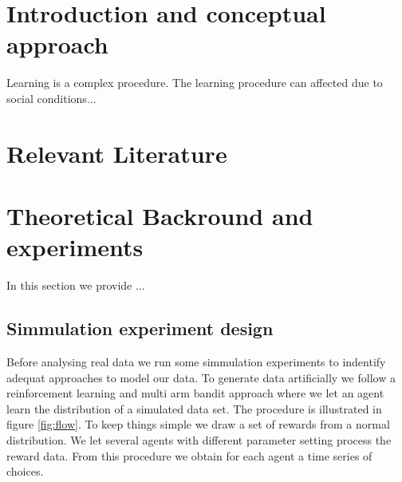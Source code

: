 \documentclass[12pt,a4paper,bibliography=totocnumbered,listof=totocnumbered]{scrartcl}
\begin{document}



\section{Introduction and conceptual approach}

Learning is a complex procedure. The learning procedure can affected due to social conditions... 


\pagebreak

\section{Relevant Literature}


\pagebreak

\section{Theoretical Backround and experiments}

In this section we provide ... 

\subsection{Simmulation experiment design}

Before analysing real data we run some simmulation experiments to indentify adequat approaches to model our data. To generate data artificially we follow a reinforcement learning and multi arm bandit approach where we let an agent learn the distribution of a simulated data set. The procedure is illustrated in figure \ref{fig:flow}. To keep things simple we draw a set of rewards from a normal distribution. We let several agents with different parameter setting process the reward data. From this procedure we obtain for each agent a time series of choices. 
\end{document}

